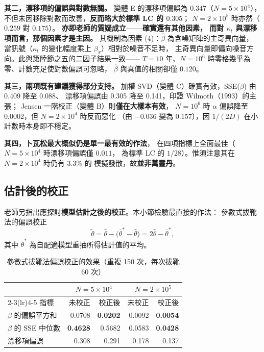 \documentclass[UTF8, fontset=macnew, a4paper, 12pt]{ctexart}
\begin{document}
\textbf{其二，漂移項的偏誤與對數無關。}
變體 E 的漂移項偏誤為 $0.347$（$N=5\times10^4$），
不但未因移除對數而改善，\textbf{反而略大於標準 LC 的 $0.305$}；
$N=2\times10^5$ 時亦然（$0.259$ 對 $0.175$）。
\textbf{亦即老師的質疑成立——確實還有其他因素，
而對 $\kappa_t$ 與漂移項而言，那個因素才是主因。}
其機制為因素 (4)：$\hat\beta$ 為含噪矩陣的主奇異向量，
當訊號（$\kappa_t$ 的變化幅度乘上 $\beta_x$）相對於噪音不足時，
主奇異向量即偏向噪音方向。此與第陸節之五的二因子結果一致——
$T=10$ 年、$N=10^6$ 時零格幾乎為零、計數充足使對數偏誤可忽略，
$\hat\beta$ 與真值的相關卻僅 $0.120$。

\textbf{其三，兩項既有建議獲得部分支持。}
加權 SVD（變體 C）確實有效，SSE($\beta$) 由 0.409 降至 0.088、
漂移項偏誤由 0.305 降至 0.141，印證 Wilmoth（1993）的主張；
Jensen 一階校正（變體 B）則\textbf{僅在大樣本有效}，
$N=10^6$ 時 $\alpha$ 偏誤降至 0.0002，但 $N=2\times10^4$ 時反而惡化
（由 $-0.036$ 變為 $0.157$），因 $1/(2D)$ 在小計數時本身即不穩定。

\textbf{其四，卜瓦松最大概似仍是單一最有效的作法}，
在四項指標上全面最佳（$N=5\times10^4$ 時漂移項偏誤僅 $0.011$，
為標準 LC 的 $1/28$）。惟須注意其在 $N=2\times10^4$ 時仍有 3.3\% 的
模擬發散，故\textbf{並非萬靈丹}。

\subsection{估計後的校正}\label{sec:postcorr}

老師另指出應探討\textbf{模型估計之後的校正}。本小節檢驗最直接的作法：
參數式拔靴法的偏誤校正
\begin{equation}
\tilde\theta=\hat\theta-\big(\bar\theta^{*}-\hat\theta\big)=2\hat\theta-\bar\theta^{*},
\end{equation}
其中 $\bar\theta^{*}$ 為自配適模型重抽所得估計值的平均。

\begin{table}[H]
\centering
\caption{參數式拔靴法偏誤校正的效果（重複 150 次，每次拔靴 60 次）}
\small
\begin{tabular}{lrrrr}
\toprule
 & \multicolumn{2}{c}{$N=5\times10^4$} & \multicolumn{2}{c}{$N=2\times10^5$}\\
\cmidrule(lr){2-3}\cmidrule(lr){4-5}
指標 & 未校正 & 校正後 & 未校正 & 校正後\\
\midrule
$\beta$ 的偏誤平方和 & 0.0708 & \textbf{0.0202} & 0.0092 & \textbf{0.0054}\\
$\beta$ 的 SSE 中位數 & \textbf{0.4628} & 0.5682 & 0.0583 & \textbf{0.0428}\\
漂移項偏誤 & 0.308 & 0.291 & 0.178 & 0.137\\
\bottomrule
\end{tabular}
\label{tab:postcorr}
\end{table}
\end{document}
